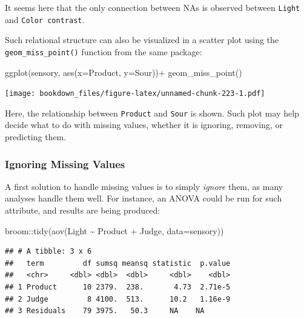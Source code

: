 \documentclass[
]{krantz}
\makeatletter
\newenvironment{Shaded}{\begin{snugshade}}{\end{snugshade}}
\newcommand{\AttributeTok}[1]{\textcolor[rgb]{0.61,0.61,0.61}{#1}}
\newcommand{\FunctionTok}[1]{\textcolor[rgb]{0,0,0}{#1}}
\newcommand{\NormalTok}[1]{#1}
\newcommand{\SpecialCharTok}[1]{\textcolor[rgb]{0,0,0}{#1}}
\newenvironment{kframe}{%
\medskip{}
\setlength{\fboxsep}{.8em}
 \def\at@end@of@kframe{}%
 \ifinner\ifhmode%
  \def\at@end@of@kframe{\end{minipage}}%
  \begin{minipage}{\columnwidth}%
 \fi\fi%
 \def\FrameCommand##1{\hskip\@totalleftmargin \hskip-\fboxsep
 \colorbox{shadecolor}{##1}\hskip-\fboxsep
     \hskip-\linewidth \hskip-\@totalleftmargin \hskip\columnwidth}%
 \MakeFramed {\advance\hsize-\width
   \@totalleftmargin\z@ \linewidth\hsize
   \@setminipage}}%
 {\par\unskip\endMakeFramed%
 \at@end@of@kframe}
\renewenvironment{Shaded}{\begin{kframe}}{\end{kframe}}
\makeatother
\begin{document}
It seems here that the only connection between NAs is observed between \texttt{Light} and \texttt{Color\ contrast}.

Such relational structure can also be visualized in a scatter plot using the \texttt{geom\_miss\_point()} function from the same package:

\begin{Shaded}
\begin{Highlighting}[]
\FunctionTok{ggplot}\NormalTok{(sensory, }\FunctionTok{aes}\NormalTok{(}\AttributeTok{x=}\NormalTok{Product, }\AttributeTok{y=}\NormalTok{Sour))}\SpecialCharTok{+}
  \FunctionTok{geom\_miss\_point}\NormalTok{()}
\end{Highlighting}
\end{Shaded}

\texttt{[image: bookdown\_files/figure-latex/unnamed-chunk-223-1.pdf]}

Here, the relationship between \texttt{Product} and \texttt{Sour} is shown. Such plot may help decide what to do with missing values, whether it is ignoring, removing, or predicting them.

\hypertarget{ignoring-missing-values}{%
\subsubsection{Ignoring Missing Values}\label{ignoring-missing-values}}

A first solution to handle missing values is to simply \emph{ignore} them, as many analyses handle them well. For instance, an ANOVA could be run for such attribute, and results are being produced:

\begin{Shaded}
\begin{Highlighting}[]
\NormalTok{broom}\SpecialCharTok{::}\FunctionTok{tidy}\NormalTok{(}\FunctionTok{aov}\NormalTok{(Light }\SpecialCharTok{\textasciitilde{}}\NormalTok{ Product }\SpecialCharTok{+}\NormalTok{ Judge, }\AttributeTok{data=}\NormalTok{sensory))}
\end{Highlighting}
\end{Shaded}

\begin{verbatim}
## # A tibble: 3 x 6
##   term         df sumsq meansq statistic  p.value
##   <chr>     <dbl> <dbl>  <dbl>     <dbl>    <dbl>
## 1 Product      10 2379.  238.       4.73  2.71e-5
## 2 Judge         8 4100.  513.      10.2   1.16e-9
## 3 Residuals    79 3975.   50.3     NA    NA
\end{verbatim}
\end{document}
